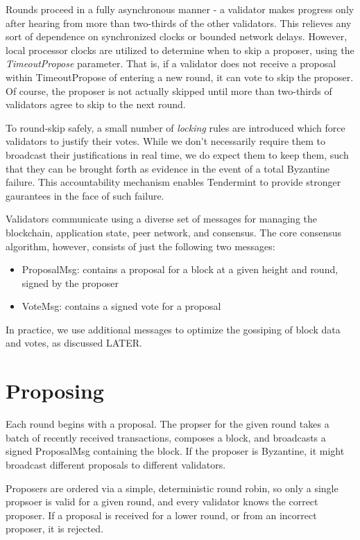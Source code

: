 Rounds proceed in a fully asynchronous manner - a validator makes progress only after hearing from more than two-thirds of the other validators.
This relieves any sort of dependence on synchronized clocks or bounded network delays.
However, local processor clocks are utilized to determine when to skip a proposer, using the \emph{TimeoutPropose} parameter.
That is, if a validator does not receive a proposal within TimeoutPropose of entering a new round, it can vote to skip the proposer.
Of course, the proposer is not actually skipped until more than two-thirds of validators agree to skip to the next round.

To round-skip safely, a small number of \emph{locking} rules are introduced which force validators to justify their votes.
While we don't necessarily require them to broadcast their justifications in real time, we do expect them to keep them,
such that they can be brought forth as evidence in the event of a total Byzantine failure.
This accountability mechanism enables Tendermint to provide stronger gaurantees in the face of such failure.

Validators communicate using a diverse set of messages for managing the blockchain, application state, peer network, and consensus.
The core consensus algorithm, however, consists of just the following two messages:

\begin{itemize}
\item{ProposalMsg: contains a proposal for a block at a given height and round, signed by the proposer}
\item{VoteMsg: contains a signed vote for a proposal}
\end{itemize}

In practice, we use additional messages to optimize the gossiping of block data and votes, as discussed LATER.

\section{Proposing}

Each round begins with a proposal. 
The propser for the given round takes a batch of recently received transactions, composes a block,
and broadcasts a signed ProposalMsg containing the block.
If the proposer is Byzantine, it might broadcast different proposals to different validators.

Proposers are ordered via a simple, deterministic round robin, 
so only a single propsoer is valid for a given round, 
and every validator knows the correct proposer. 
If a proposal is received for a lower round, or from an incorrect proposer, it is rejected.


